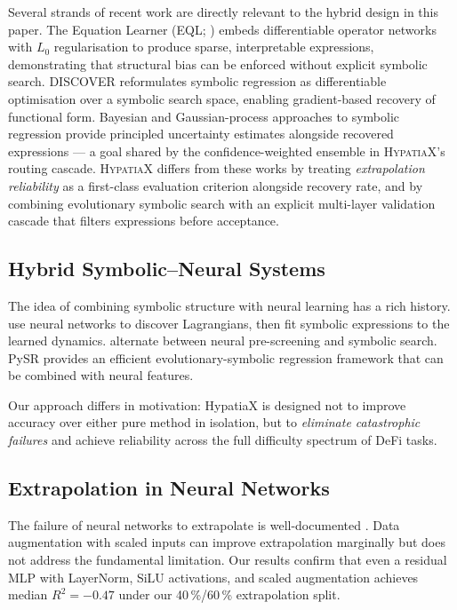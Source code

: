 \documentclass[twoside,11pt]{article}
\newcommand{\Rsq}{R^{2}}
\begin{document}
Several strands of recent work are directly relevant to the hybrid design in
this paper.  The Equation Learner (EQL; \citealt{sahoo2018eql}) embeds
differentiable operator networks with $L_0$ regularisation to produce sparse,
interpretable expressions, demonstrating that structural bias can be enforced
without explicit symbolic search.  DISCOVER \citep{liu2022discover} reformulates
symbolic regression as differentiable optimisation over a symbolic search space,
enabling gradient-based recovery of functional form.  Bayesian and
Gaussian-process approaches to symbolic regression \citep{jin2020bayesian}
provide principled uncertainty estimates alongside recovered expressions ---
a goal shared by the confidence-weighted ensemble in \textsc{HypatiaX}'s
routing cascade.  \textsc{HypatiaX} differs from these works by treating
\emph{extrapolation reliability} as a first-class evaluation criterion
alongside recovery rate, and by combining evolutionary symbolic search with an
explicit multi-layer validation cascade that filters expressions before
acceptance.

\subsection{Hybrid Symbolic--Neural Systems}\label{subsec:hybrid-symbolicneural-systems}
\label{sec:related_hybrid}

The idea of combining symbolic structure with neural learning has a rich history.
\citet{cranmer2020lagrangian} use neural networks to discover Lagrangians, then
fit symbolic expressions to the learned dynamics.  \citet{udrescu2020ai} alternate
between neural pre-screening and symbolic search.  PySR \citep{cranmer2023pysr}
provides an efficient evolutionary-symbolic regression framework that can be
combined with neural features.

Our approach differs in motivation: HypatiaX is designed not to improve accuracy
over either pure method in isolation, but to \emph{eliminate catastrophic failures}
and achieve reliability across the full difficulty spectrum of DeFi tasks.

\subsection{Extrapolation in Neural Networks}\label{subsec:extrapolation-in-neural-networks}
\label{sec:related_extrap}

The failure of neural networks to extrapolate is well-documented \citep{xu2021neural}.
Data augmentation with scaled inputs \citep{lim2021temporal} can improve extrapolation
marginally but does not address the fundamental limitation.  Our results confirm
that even a residual MLP with LayerNorm, SiLU activations, and scaled augmentation
achieves median $\Rsq=-0.47$ under our 40\,\%/60\,\% extrapolation split.
\end{document}
